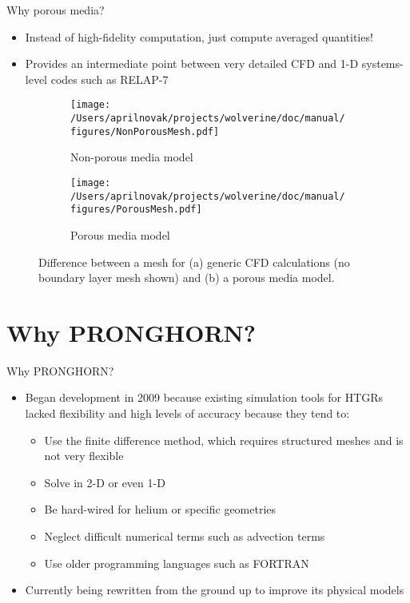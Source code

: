 \documentclass{beamer}
\begin{document}

\begin{frame}{Why porous media?}

\begin{itemize}
\item Instead of high-fidelity computation, just compute averaged quantities!
\item Provides an intermediate point between very detailed CFD and 1-D systems-level codes such as RELAP-7\newline
\end{itemize}

\begin{figure}[H]
\centering
\begin{subfigure}{.25\textwidth}
  \centering
  \texttt{[image: /Users/aprilnovak/projects/wolverine/doc/manual/figures/NonPorousMesh.pdf]}
  \caption{Non-porous media model}
\end{subfigure}
\begin{subfigure}{.25\textwidth}
  \centering
  \texttt{[image: /Users/aprilnovak/projects/wolverine/doc/manual/figures/PorousMesh.pdf]}
  \caption{Porous media model}
\end{subfigure}
\caption{Difference between a mesh for (a) generic CFD calculations (no boundary layer mesh shown) and (b) a porous media model.}
\end{figure}

\end{frame}


\section{Why PRONGHORN?}

\begin{frame}{Why PRONGHORN?}

\begin{itemize}
\item Began development in 2009 because existing simulation tools for HTGRs lacked flexibility and high levels of accuracy because they tend to:
	\begin{itemize}
		\item Use the finite difference method, which requires structured meshes and is not very flexible
		\item Solve in 2-D or even 1-D
		\item Be hard-wired for helium or specific geometries
		\item Neglect difficult numerical terms such as advection terms
		\item Use older programming languages such as FORTRAN
	\end{itemize}
\item Currently being rewritten from the ground up to improve its physical models
\end{itemize}

\end{frame}
\end{document}
